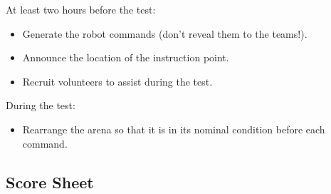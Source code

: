 At least two hours before the test:
\begin{itemize}[nosep]
	\item Generate the robot commands (don't reveal them to the teams!).
	\item Announce the location of the instruction point.
	\item Recruit volunteers to assist during the test.
	\newline
\end{itemize}

\noindent During the test:
\begin{itemize}[nosep]
	\item Rearrange the arena so that it is in its nominal condition before each command.
\end{itemize}

\subsection*{Score Sheet}


